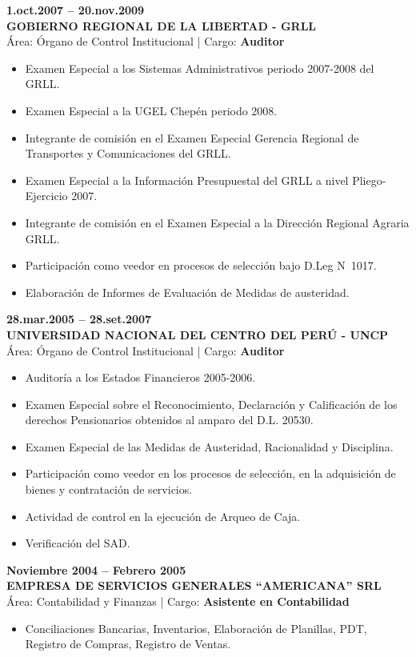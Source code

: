 \documentclass[11pt,a4paper]{article}
\begin{document}
\noindent
\textbf{1.oct.2007 -- 20.nov.2009}\\
\textbf{GOBIERNO REGIONAL DE LA LIBERTAD - GRLL}\\
\'Area: \'Organo de Control Institucional \quad | \quad Cargo: \textbf{Auditor}
\begin{itemize}
\item Examen Especial a los Sistemas Administrativos periodo 2007-2008 del GRLL.
\item Examen Especial a la UGEL Chep\'en periodo 2008.
\item Integrante de comisi\'on en el Examen Especial Gerencia Regional de Transportes y Comunicaciones del GRLL.
\item Examen Especial a la Informaci\'on Presupuestal del GRLL a nivel Pliego-Ejercicio 2007.
\item Integrante de comisi\'on en el Examen Especial a la Direcci\'on Regional Agraria GRLL.
\item Participaci\'on como veedor en procesos de selecci\'on bajo D.Leg N\textdegree~1017.
\item Elaboraci\'on de Informes de Evaluaci\'on de Medidas de austeridad.
\end{itemize}

\noindent
\textbf{28.mar.2005 -- 28.set.2007}\\
\textbf{UNIVERSIDAD NACIONAL DEL CENTRO DEL PER\'U - UNCP}\\
\'Area: \'Organo de Control Institucional \quad | \quad Cargo: \textbf{Auditor}
\begin{itemize}
\item Auditor\'ia a los Estados Financieros 2005-2006.
\item Examen Especial sobre el Reconocimiento, Declaraci\'on y Calificaci\'on de los derechos Pensionarios obtenidos al amparo del D.L. 20530.
\item Examen Especial de las Medidas de Austeridad, Racionalidad y Disciplina.
\item Participaci\'on como veedor en los procesos de selecci\'on, en la adquisici\'on de bienes y contrataci\'on de servicios.
\item Actividad de control en la ejecuci\'on de Arqueo de Caja.
\item Verificaci\'on del SAD.
\end{itemize}

\noindent
\textbf{Noviembre 2004 -- Febrero 2005}\\
\textbf{EMPRESA DE SERVICIOS GENERALES ``AMERICANA'' SRL}\\
\'Area: Contabilidad y Finanzas \quad | \quad Cargo: \textbf{Asistente en Contabilidad}
\begin{itemize}
\item Conciliaciones Bancarias, Inventarios, Elaboraci\'on de Planillas, PDT, Registro de Compras, Registro de Ventas.
\end{itemize}
\end{document}
